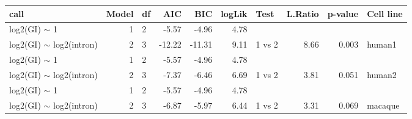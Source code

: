 \begin{table}[ht]
\centering
\begin{tabular}{lrlrrrlrrl}
  \hline
call & Model & df & AIC & BIC & logLik & Test & L.Ratio & p-value & Cell line \\ 
  \hline
log2(GI) $\sim$ 1 &  1 & 2 & -5.57 & -4.96 & 4.78 &  &  &  &  \\ 
  log2(GI) $\sim$ log2(intron) &  2 & 3 & -12.22 & -11.31 & 9.11 & 1 vs 2 & 8.66 & 0.003 & human1 \\ 
   \hline
log2(GI) $\sim$ 1 &  1 & 2 & -5.57 & -4.96 & 4.78 &  &  &  &  \\ 
  log2(GI) $\sim$ log2(intron) &  2 & 3 & -7.37 & -6.46 & 6.69 & 1 vs 2 & 3.81 & 0.051 & human2 \\ 
   \hline
log2(GI) $\sim$ 1 &  1 & 2 & -5.57 & -4.96 & 4.78 &  &  &  &  \\ 
  log2(GI) $\sim$ log2(intron) &  2 & 3 & -6.87 & -5.97 & 6.44 & 1 vs 2 & 3.31 & 0.069 & macaque \\ 
   \hline
\end{tabular}
\end{table}
